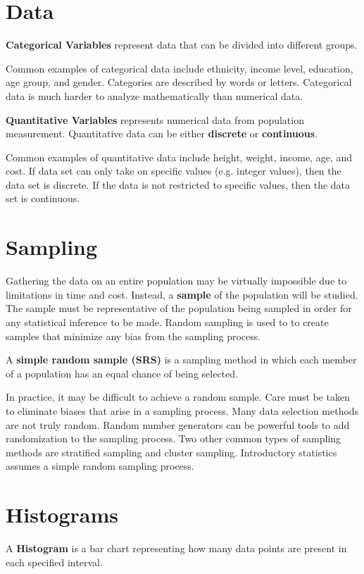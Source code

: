\documentclass{article}
\theoremstyle{definition}
\begin{document}
\section{Data}
\begin{definition}
    \textbf{Categorical Variables} represent data that can be divided into different
    groups.
\end{definition}
\noindent Common examples of categorical data include ethnicity, income level,
education, age group, and gender. Categories are described by words or letters.
Categorical data is much harder to analyze mathematically than numerical data.
\begin{definition}
    \textbf{Quantitative Variables} represents numerical data from population
    measurement. Quantitative data can be either \textbf{discrete} or
    \textbf{continuous}.
\end{definition}
\noindent Common examples of quantitative data include height, weight, income, age, and
cost. If data set can only take on specific values (e.g. integer values), then
the data set is discrete. If the data is not restricted to specific values, then
the data set is continuous.

\section{Sampling}
Gathering the data on an entire population may be virtually impossible due to
limitations in time and cost. Instead, a \textbf{sample} of the population will
be studied. The sample must be representative of the population being sampled in
order for any statistical inference to be made. Random sampling is used to to
create samples that minimize any bias from the sampling process. 
\begin{definition}
    A \textbf{simple random sample (SRS)} is a sampling method in which each
    member of a population has an equal chance of being selected.
\end{definition}
\noindent In practice, it may be difficult to achieve a random sample. Care must be taken
to eliminate biases that arise in a sampling process. Many data selection
methods are not truly random. Random number generators can be powerful tools to
add randomization to the sampling process. Two other common types of sampling methods are 
stratified sampling and cluster sampling. Introductory statistics assumes a simple random 
sampling process.
    
\section{Histograms}
\begin{definition}
    A \textbf{Histogram} is a bar chart representing how many data points are
    present in each specified interval.
\end{definition}
\end{document}
